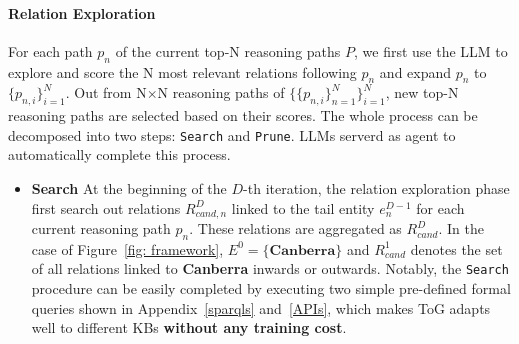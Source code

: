 \paragraph{Relation Exploration}
\label{sec: relation_exploration}
For each path $p_n$ of the current top-N reasoning paths $P$, we first use the LLM to explore and score the N most relevant relations following $p_n$ and expand $p_n$ to $\{p_{n,i}\}^N_{i=1}$. Out from N$\times$N reasoning paths of $\{\{p_{n,i}\}^N_{n=1}\}^N_{i=1}$,  new top-N reasoning paths are selected based on their scores. The whole process can be decomposed into two steps: \texttt{Search} and \texttt{Prune}. LLMs serverd as agent to automatically complete this process.
\begin{itemize}[leftmargin=*]


    
    \item \textbf{Search} 
    At the beginning of the $D$-th iteration, the relation exploration phase first search out relations $R^{D}_{cand,n}$ linked to the tail entity $e^{D-1}_{n}$ for each current reasoning path $p_n$. These relations are aggregated as $R^{D}_{cand}$. In the case of Figure~\ref{fig: framework}, $E^{0}=\{\textbf{Canberra}\}$ and $R^{1}_{cand}$ denotes the set of all relations linked to \textbf{Canberra} inwards or outwards. Notably, the \texttt{Search} procedure can be easily completed by executing two simple pre-defined formal queries shown in Appendix~\ref{sparqls} and~\ref{APIs}, which makes ToG adapts well to different KBs \textbf{without any training cost}.
    

\end{itemize}
